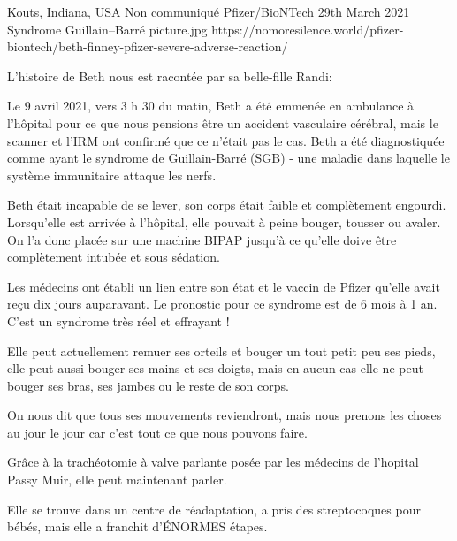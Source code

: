 {Kouts, Indiana, USA}
{Non communiqué}
{Pfizer/BioNTech}
{29th March 2021}
{Syndrome Guillain–Barré}
{picture.jpg}
{https://nomoresilence.world/pfizer-biontech/beth-finney-pfizer-severe-adverse-reaction/}
{

L'histoire de Beth nous est racontée par sa belle-fille Randi:

Le 9 avril 2021, vers 3 h 30 du matin, Beth a été emmenée en ambulance à
l'hôpital pour ce que nous pensions être un accident vasculaire cérébral, mais
le scanner et l'IRM ont confirmé que ce n'était pas le cas. Beth a été
diagnostiquée comme ayant le syndrome de Guillain-Barré (SGB) - une maladie dans
laquelle le système immunitaire attaque les nerfs.

Beth était incapable de se lever, son corps était faible et complètement
engourdi. Lorsqu'elle est arrivée à l'hôpital, elle pouvait à peine bouger,
tousser ou avaler. On l'a donc placée sur une machine BIPAP jusqu'à ce qu'elle
doive être complètement intubée et sous sédation.

Les médecins ont établi un lien entre son état et le vaccin de Pfizer qu'elle
avait reçu dix jours auparavant. Le pronostic pour ce syndrome est de 6 mois à 1
an. C'est un syndrome très réel et effrayant !

Elle peut actuellement remuer ses orteils et bouger un tout petit peu ses pieds,
elle peut aussi bouger ses mains et ses doigts, mais en aucun cas elle ne peut
bouger ses bras, ses jambes ou le reste de son corps.

On nous dit que tous ses mouvements reviendront, mais nous prenons les choses au
jour le jour car c'est tout ce que nous pouvons faire.

Grâce à la trachéotomie à valve parlante posée par les médecins de l'hopital
Passy Muir, elle peut maintenant parler.

Elle se trouve dans un centre de réadaptation, a pris des streptocoques pour
bébés, mais elle a franchit d'ÉNORMES étapes.

}
